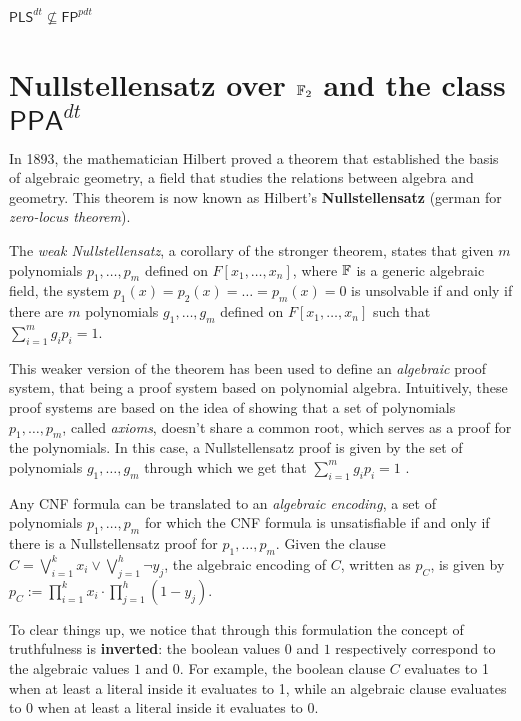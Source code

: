 \begin{proposition}
    \label{pls_dt_not_inside_fp_pdt}
    $\mathsf{PLS}^{dt} \not\subseteq \mathsf{FP}^{pdt}$
\end{proposition}

\section{Nullstellensatz over $\mathbb{F}_2$ and the class $\mathsf{PPA}^{dt}$}

In 1893, the mathematician Hilbert proved a theorem that established the basis of algebraic geometry, a field that studies the relations between algebra and geometry. This theorem is now known as Hilbert's \textbf{Nullstellensatz} (german for \textit{zero-locus theorem}).

The \textit{weak Nullstellensatz}, a corollary of the stronger theorem, states that given $m$ polynomials $p_1, \ldots, p_m$ defined on $F[x_1, \ldots, x_n]$, where $\mathbb{F}$ is a generic algebraic field, the system $p_1(x) = p_2(x) = \ldots = p_m(x) = 0$ is unsolvable if and only if there are $m$ polynomials $g_1, \ldots, g_m$ defined on $F[x_1, \ldots, x_n]$ such that $\sum_{i=1}^m g_ip_i = 1$.

This weaker version of the theorem has been used to define an \textit{algebraic} proof system, that being a proof system based on polynomial algebra. Intuitively, these proof systems are based on the idea of showing that a set of polynomials $p_1, \ldots, p_m$, called \textit{axioms}, doesn't share a common root, which serves as a proof for the polynomials. In this case, a Nullstellensatz proof is given by the set of polynomials $g_1, \ldots, g_m$ through which we get that $\sum_{i=1}^m g_ip_i = 1$  \cite{ns_definitions}. 

Any CNF formula can be translated to an \textit{algebraic encoding}, a set of polynomials $p_1, \ldots, p_m$ for which the CNF formula is unsatisfiable if and only if there is a Nullstellensatz proof for $p_1, \ldots, p_m$. Given the clause $C = \bigvee_{i = 1}^k x_i \lor \bigvee_{j = 1}^h \lnot y_j$, the algebraic encoding of $C$, written as $p_C$, is given by $p_C := \prod_{i = 1}^{k} x_i \cdot \prod_{j = 1}^h (1- y_j)$. 

To clear things up, we notice that through this formulation the concept of truthfulness is \textbf{inverted}: the boolean values $0$ and $1$ respectively correspond to the algebraic values $1$ and $0$. For example, the boolean clause $C$ evaluates to 1 when at least a literal inside it evaluates to 1, while an algebraic clause evaluates to 0 when at least a literal inside it evaluates to 0.

